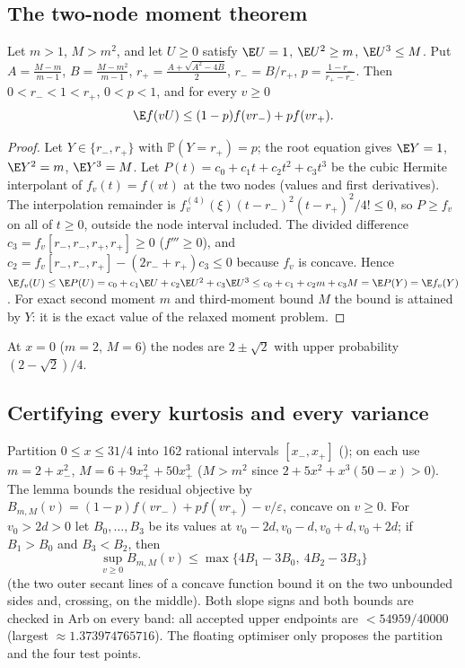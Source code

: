 \subsection{The two-node moment theorem}
\begin{lemma}[\st{P}]\label{lem:twonode}
Let $m>1$, $M>m^2$, and let $U\ge0$ satisfy $\E U=1$, $\E U^2\ge m$, $\E U^3\le M$. Put $A=\frac{M-m}{m-1}$, $B=\frac{M-m^2}{m-1}$, $r_+=\frac{A+\sqrt{A^2-4B}}2$, $r_-=B/r_+$, $p=\frac{1-r_-}{r_+-r_-}$.
Then $0<r_-<1<r_+$, $0<p<1$, and for every $v\ge0$
\begin{equation}\label{eq:rescub6}
\E f(vU)\le(1-p)f(vr_-)+pf(vr_+).
\end{equation}
\end{lemma}
\begin{proof}
Let $Y\in\{r_-,r_+\}$ with $\mathbb P(Y=r_+)=p$; the root equation gives $\E Y=1$, $\E Y^2=m$, $\E Y^3=M$. Let $P(t)=c_0+c_1t+c_2t^2+c_3t^3$ be the cubic Hermite interpolant of $f_v(t)=f(vt)$ at the two
nodes (values and first derivatives). The interpolation remainder is $f_v^{(4)}(\xi)(t-r_-)^2(t-r_+)^2/4!\le0$, so $P\ge f_v$ on all of $t\ge0$, outside the node interval included. The divided
difference $c_3=f_v[r_-,r_-,r_+,r_+]\ge0$ ($f'''\ge0$), and $c_2=f_v[r_-,r_-,r_+]-(2r_-+r_+)c_3\le0$ because $f_v$ is concave. Hence
$\E f_v(U)\le\E P(U)=c_0+c_1\E U+c_2\E U^2+c_3\E U^3\le c_0+c_1+c_2m+c_3M=\E P(Y)=\E f_v(Y)$. For exact second moment $m$ and third-moment bound $M$ the bound is attained by $Y$: it is the exact
value of the relaxed moment problem.
\end{proof}
At $x=0$ ($m=2$, $M=6$) the nodes are $2\pm\sqrt2$ with upper probability $(2-\sqrt2)/4$.

\subsection{Certifying every kurtosis and every variance}
Partition $0\le x\le31/4$ into 162 rational intervals $[x_-,x_+]$ (); on each use $m=2+x_-^2$, $M=6+9x_+^2+50x_+^3$ ($M>m^2$ since $2+5x^2+x^3(50-x)>0$). The lemma
bounds the residual objective by $B_{m,M}(v)=(1-p)f(vr_-)+pf(vr_+)-v/\varepsilon$, concave on $v\ge0$. For $v_0>2d>0$ let $B_0,\ldots,B_3$ be its values at $v_0-2d,v_0-d,v_0+d,v_0+2d$; if $B_1>B_0$
and $B_3<B_2$, then
\begin{equation}\label{eq:rescub8}
\sup_{v\ge0}B_{m,M}(v)\le\max\{4B_1-3B_0,\ 4B_2-3B_3\}
\end{equation}
(the two outer secant lines of a concave function bound it on the two unbounded sides and, crossing, on the middle). Both slope signs and both bounds are checked in Arb on every band: all
accepted upper endpoints are $<54959/40000$ (largest $\approx1.373974765716$). The floating optimiser only proposes the partition and the four test points.

